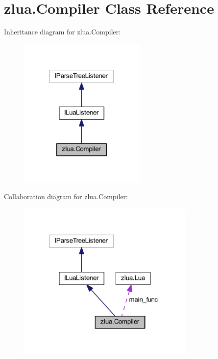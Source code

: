 \hypertarget{classzlua_1_1_compiler}{}\section{zlua.\+Compiler Class Reference}
\label{classzlua_1_1_compiler}


Inheritance diagram for zlua.\+Compiler\+:
\nopagebreak
\begin{figure}[H]
\begin{center}
\leavevmode
\includegraphics[width=178pt]{classzlua_1_1_compiler__inherit__graph}
\end{center}
\end{figure}


Collaboration diagram for zlua.\+Compiler\+:
\nopagebreak
\begin{figure}[H]
\begin{center}
\leavevmode
\includegraphics[width=247pt]{classzlua_1_1_compiler__coll__graph}
\end{center}
\end{figure}
